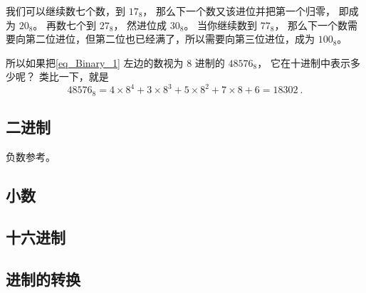 我们可以继续数七个数，到 $17_\text{8}$， 那么下一个数又该进位并把第一个归零， 即成为 $20_\text{8}$。 再数七个到 $27_\text{8}$， 然进位成 $30_\text{8}$。 当你继续数到 $77_\text{8}$， 那么下一个数需要向第二位进位，但第二位也已经满了，所以需要向第三位进位，成为 $100_\text{8}$。

所以如果把\autoref{eq_Binary_1} 左边的数视为 $8$ 进制的 $48576_\text{8}$， 它在十进制中表示多少呢？ 类比一下，就是
\begin{equation}
48576_\text{8} = 4\times 8^{4} + 3\times 8^{3} + 5\times 8^{2} + 7\times 8 + 6 = 18302~.
\end{equation}

\subsection{二进制}
负数参考。

\subsection{小数}

\subsection{十六进制}

\subsection{进制的转换}
